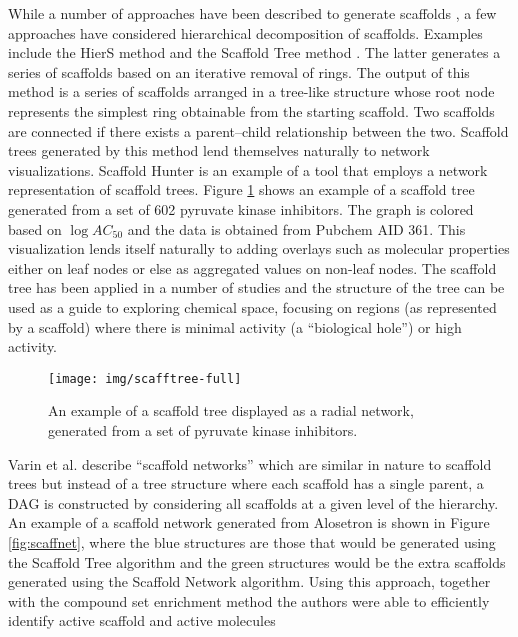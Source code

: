 \documentclass[]{book}
\begin{document}
While a number of approaches have been described to generate scaffolds
\cite{Lewell:1998aa,Bemis:1996aa,Katritzky:2000wf}, a few approaches
have considered hierarchical decomposition of scaffolds. Examples
include the HierS method \cite{Wilkens:2005il} and the Scaffold Tree
method \cite{Schuffenhauer:2007oz}. The latter generates a series of
scaffolds based on an iterative removal of rings. The output of this
method is a series of scaffolds arranged in a tree-like structure
whose root node represents the simplest ring obtainable from the
starting scaffold.  Two scaffolds are connected if there exists a
parent--child relationship between the two. Scaffold trees generated
by this method lend themselves naturally to network
visualizations. Scaffold Hunter \cite{Wetzel:2009uq} is an example of
a tool that employs a network representation of scaffold trees. Figure
\ref{fig:scafftree} shows an example of a scaffold tree generated from
a set of 602 pyruvate kinase inhibitors. The graph is colored based on
$\log AC_{50}$ and the data is obtained from Pubchem AID 361. This
visualization lends itself naturally to adding overlays such as
molecular properties either on leaf nodes or else as aggregated values
on non-leaf nodes. The scaffold tree has been applied in a number of
studies \cite{Wetzel:2009uq,Renner:2009wm} and the structure of the
tree can be used as a guide to exploring chemical space, focusing on
regions (as represented by a scaffold) where there is minimal activity
(a ``biological hole'') or high activity.

\begin{figure}[h]
  \centering
  \texttt{[image: img/scafftree-full]}
  \caption{An example of a scaffold tree displayed as a  radial
    network, generated from a set of pyruvate kinase inhibitors.}
  \label{fig:scafftree}
\end{figure}

Varin et al. \cite{Varin:2011ve} describe ``scaffold networks'' which
are similar in nature to scaffold trees but instead of a tree
structure where each scaffold has a single parent, a DAG is
constructed by considering all scaffolds at a given level of the
hierarchy. An example of a scaffold network generated from Alosetron
is shown in Figure \ref{fig:scaffnet}, where the blue structures are
those that would be generated using the Scaffold Tree algorithm and
the green structures would be the extra scaffolds generated using the
Scaffold Network algorithm. Using this approach, together with the
compound set enrichment method \cite{Varin:2010zh} the authors were
able to efficiently identify active scaffold and active molecules
\end{document}
